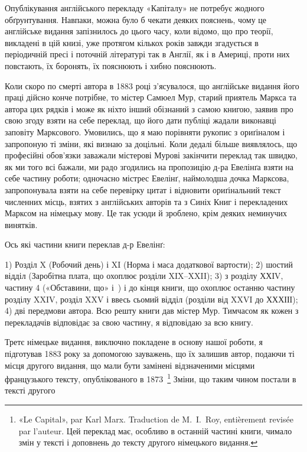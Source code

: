 

Опублікування англійського перекладу «Капіталу» не потребує жодного
обґрунтування. Навпаки, можна було б чекати деяких пояснень, чому це
англійське видання запізнилось до цього часу, коли відомо, що про теорії,
викладені в цій книзі, уже протягом кількох років завжди згадується в
періодичній пресі і поточній літературі так в Англії, як і в Америці,
проти них повстають, їх боронять, їх пояснюють і хибно пояснюють.

Коли скоро по смерті автора в 1883 році з’ясувалося, що англійське
видання його праці дійсно конче потрібне, то містер Самюел
Мур, старий приятель Маркса та автора цих рядків і може
як ніхто інший обізнаний з самою книгою, заявив про свою згоду
взяти на себе переклад, що його дати публіці жадали виконавці
заповіту Марксового. Умовились, що я маю порівняти рукопис з
ориґіналом і запропоную ті зміни, які визнаю за доцільні. Коли
дедалі більше виявлялось, що професійні обов’язки заважали
містерові Мурові закінчити переклад так швидко, як ми того всі
бажали, ми радо згодились на пропозицію д-ра Евелінґа взяти
на себе частину роботи; одночасно містрес Евелінґ, наймолодша
дочка Марксова, запропонувала взяти на себе перевірку цитат і
відновити ориґінальний текст численних місць, взятих з англійських
авторів та з Синіх Книг і перекладених Марксом на німецьку
мову. Це так усюди й зроблено, крім деяких неминучих винятків.

Ось які частини книги переклав д-р Евелінґ:

1) Розділ X (Робочий день) і XI (Норма і маса додаткової
вартости); 2) шостий відділ (Заробітна плата, що охоплює розділи
XIX--XXII); 3) з розділу ХХІV, частину 4 («Обставини, що»
і~) і до кінця книги, що охоплює останню частину розділу
XXIV, розділ XXV і ввесь сьомий відділ (розділи від XXVI
до ХХХІІІ); 4) дві передмови автора. Всю решту книги дав містер
Мур. Тимчасом як кожен з перекладачів відповідає за свою
частину, я відповідаю за всю книгу.

Третє німецьке видання, виключно покладене в основу нашої
роботи, я підготував 1883 року за допомогою зауважень, що їх
залишив автор, подаючи ті місця другого видання, що мали бути
замінені відзначеними місцями французького тексту, опублікованого
в 1873~\footnote*{
«Le Capital», par Karl Marx. Traduction de M.~I.~Roy, entièrement
revisée par l’auteur. Цей переклад має, особливо в останній частині книги,
чимало змін у тексті і доповнень до тексту другого німецького видання.
} Зміни, що таким чином постали в тексті другого
\parbreak{}  %
